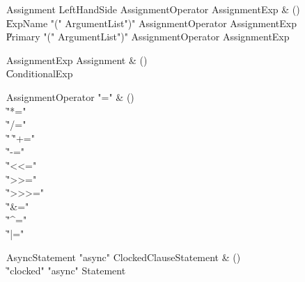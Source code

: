 \begin{bbgrammar}

Assignment \label{prod:Assignment}  \: LeftHandSide AssignmentOperator AssignmentExp & () \\

    \| ExpName  \xcd"(" ArgumentList\opt \xcd")" AssignmentOperator AssignmentExp \\
    \| Primary  \xcd"(" ArgumentList\opt \xcd")" AssignmentOperator AssignmentExp \\

\end{bbgrammar}

\begin{bbgrammar}

AssignmentExp \label{prod:AssignmentExp}  \: Assignment & () \\

    \| ConditionalExp \\

\end{bbgrammar}

\begin{bbgrammar}

AssignmentOperator \label{prod:AssignmentOperator}  \: \xcd"=" & () \\

    \| \xcd"*=" \\
    \| \xcd"/=" \\
    \| \xcd"%
    \| \xcd"+=" \\
    \| \xcd"-=" \\
    \| \xcd"<<=" \\
    \| \xcd">>=" \\
    \| \xcd">>>=" \\
    \| \xcd"&=" \\
    \| \xcd"^=" \\
    \| \xcd"|=" \\

\end{bbgrammar}

\begin{bbgrammar}

AsyncStatement \label{prod:AsyncStatement}  \: \xcd"async" ClockedClause\opt Statement & () \\

    \| \xcd"clocked" \xcd"async" Statement \\

\end{bbgrammar}

